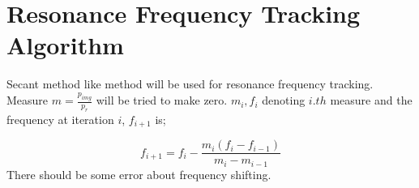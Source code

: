 \documentclass{article}
\begin{document}
\section{Resonance Frequency Tracking Algorithm}
Secant method like method will be used for resonance frequency tracking. Measure $m = \frac{p_{img}}{p_r}$ will be tried to make zero.
$m_i, f_i$ denoting $i.th$ measure and the frequency at iteration $i$, $f_{i+1}$ is;

\begin{equation}
    f_{i+1} = f_i - \frac{m_i(f_i - f_{i-1})}{m_i - m_{i-1}}
\end{equation}
There should be some error about frequency shifting.
\end{document}
